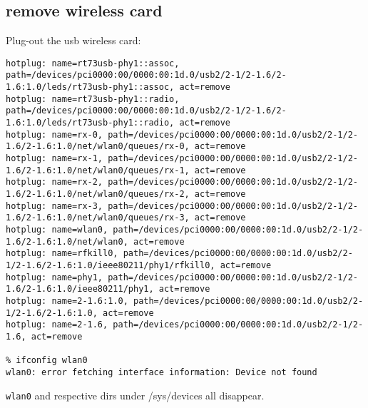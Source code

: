 \documentclass[a4paper]{report}
\begin{document}
\subsection{remove wireless card}
Plug-out the usb wireless card:
\begin{lstlisting}
hotplug: name=rt73usb-phy1::assoc, path=/devices/pci0000:00/0000:00:1d.0/usb2/2-1/2-1.6/2-1.6:1.0/leds/rt73usb-phy1::assoc, act=remove
hotplug: name=rt73usb-phy1::radio, path=/devices/pci0000:00/0000:00:1d.0/usb2/2-1/2-1.6/2-1.6:1.0/leds/rt73usb-phy1::radio, act=remove
hotplug: name=rx-0, path=/devices/pci0000:00/0000:00:1d.0/usb2/2-1/2-1.6/2-1.6:1.0/net/wlan0/queues/rx-0, act=remove
hotplug: name=rx-1, path=/devices/pci0000:00/0000:00:1d.0/usb2/2-1/2-1.6/2-1.6:1.0/net/wlan0/queues/rx-1, act=remove
hotplug: name=rx-2, path=/devices/pci0000:00/0000:00:1d.0/usb2/2-1/2-1.6/2-1.6:1.0/net/wlan0/queues/rx-2, act=remove
hotplug: name=rx-3, path=/devices/pci0000:00/0000:00:1d.0/usb2/2-1/2-1.6/2-1.6:1.0/net/wlan0/queues/rx-3, act=remove
hotplug: name=wlan0, path=/devices/pci0000:00/0000:00:1d.0/usb2/2-1/2-1.6/2-1.6:1.0/net/wlan0, act=remove
hotplug: name=rfkill0, path=/devices/pci0000:00/0000:00:1d.0/usb2/2-1/2-1.6/2-1.6:1.0/ieee80211/phy1/rfkill0, act=remove
hotplug: name=phy1, path=/devices/pci0000:00/0000:00:1d.0/usb2/2-1/2-1.6/2-1.6:1.0/ieee80211/phy1, act=remove
hotplug: name=2-1.6:1.0, path=/devices/pci0000:00/0000:00:1d.0/usb2/2-1/2-1.6/2-1.6:1.0, act=remove
hotplug: name=2-1.6, path=/devices/pci0000:00/0000:00:1d.0/usb2/2-1/2-1.6, act=remove

% ifconfig wlan0 
wlan0: error fetching interface information: Device not found
\end{lstlisting}
{\tt wlan0} and respective dirs under /sys/devices all disappear.
\end{document}
